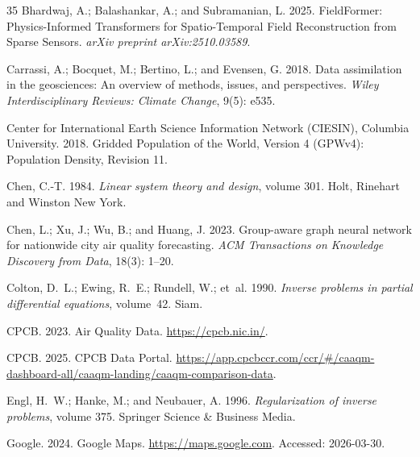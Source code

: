 \documentclass[letterpaper]{article} %
\theoremstyle{plain}
\theoremstyle{definition}
\theoremstyle{remark}
\begin{document}
\begin{thebibliography}{35}
Bhardwaj, A.; Balashankar, A.; and Subramanian, L. 2025.
\newblock FieldFormer: Physics-Informed Transformers for Spatio-Temporal Field
  Reconstruction from Sparse Sensors.
\newblock \emph{arXiv preprint arXiv:2510.03589}.

Carrassi, A.; Bocquet, M.; Bertino, L.; and Evensen, G. 2018.
\newblock Data assimilation in the geosciences: An overview of methods, issues,
  and perspectives.
\newblock \emph{Wiley Interdisciplinary Reviews: Climate Change}, 9(5): e535.

{Center for International Earth Science Information Network (CIESIN), Columbia
  University}. 2018.
\newblock Gridded Population of the World, Version 4 (GPWv4): Population
  Density, Revision 11.

Chen, C.-T. 1984.
\newblock \emph{Linear system theory and design}, volume 301.
\newblock Holt, Rinehart and Winston New York.

Chen, L.; Xu, J.; Wu, B.; and Huang, J. 2023.
\newblock Group-aware graph neural network for nationwide city air quality
  forecasting.
\newblock \emph{ACM Transactions on Knowledge Discovery from Data}, 18(3):
  1--20.

Colton, D.~L.; Ewing, R.~E.; Rundell, W.; et~al. 1990.
\newblock \emph{Inverse problems in partial differential equations}, volume~42.
\newblock Siam.

CPCB. 2023.
\newblock Air Quality Data.
\newblock \url{https://cpcb.nic.in/}.

CPCB. 2025.
\newblock CPCB Data Portal.
\newblock
  \url{https://app.cpcbccr.com/ccr/#/caaqm-dashboard-all/caaqm-landing/caaqm-comparison-data}.

Engl, H.~W.; Hanke, M.; and Neubauer, A. 1996.
\newblock \emph{Regularization of inverse problems}, volume 375.
\newblock Springer Science \& Business Media.

{Google}. 2024.
\newblock Google Maps.
\newblock \url{https://maps.google.com}.
\newblock Accessed: 2026-03-30.


\end{thebibliography}
\end{document}

